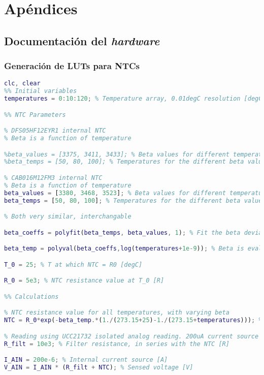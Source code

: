 \chapter{Apéndices}

\newpage
\section{Documentación del \textit{hardware}}
\subsection{Generación de LUTs para NTCs}
\begin{lstlisting}[language=Matlab, basicstyle=\ttfamily\small, breaklines=true, frame=single]
%% Temperature sensing LUT calculation for DFS05HF12EYR1
clc, clear
%% Initial variables
temperatures = 0:10:120; % Temperature array, 0.01degC resolution [degC]

%% NTC Parameters

% DFS05HF12EYR1 internal NTC
% Beta is a function of temperature

%beta_values = [3375, 3411, 3433]; % Beta values for different temperatures [K]
%beta_temps = [50, 80, 100]; % Temperatures for the different beta values [degC]

% CAB016M12FM3 internal NTC
% Beta is a function of temperature
beta_values = [3380, 3468, 3523]; % Beta values for different temperatures [K]
beta_temps = [50, 80, 100]; % Temperatures for the different beta values [degC]

% Both very similar, interchangable

beta_coeffs = polyfit(beta_temps, beta_values, 1); % Fit the beta deviation with linear regression

beta_temp = polyval(beta_coeffs,log(temperatures+1e-9)); % Beta is evaluated for all temperatures, avoiding 0degC [K]

T_0 = 25; % T at which NTC = R0 [degC]

R_0 = 5e3; % NTC resistance value at T_0 [R]

%% Calculations

% NTC resistance value for all temperatures, with varying beta
NTC = R_0*exp(-beta_temp.*(1./(273.15+25)-1./(273.15+temperatures))); % NTC resistance with no errors [R]

% Reading using UCC21732 isolated analog reading. 200uA current source 
R_filt = 10e3; % Filter resistance, in series with the NTC [R]

I_AIN = 200e-6; % Internal current source [A]
V_AIN = I_AIN * (R_filt + NTC); % Sensed voltage [V]


\end{lstlisting}

